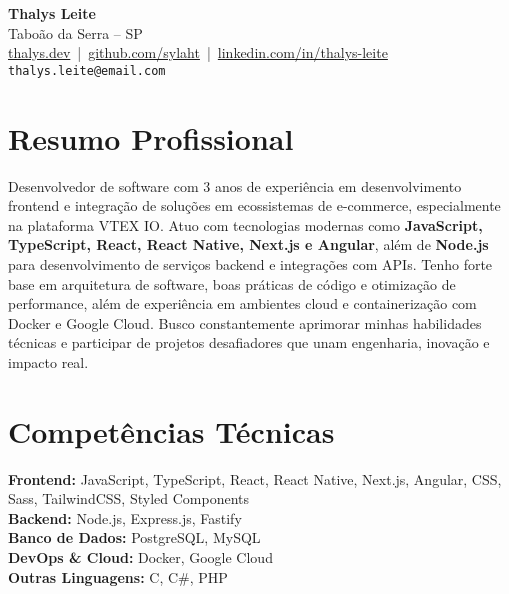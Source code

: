 \documentclass[a4paper,10pt]{article}
\begin{document}
\begin{center}
    {\LARGE \textbf{Thalys Leite}}\\[4pt]
    Taboão da Serra – SP \\[2pt]
    \href{https://thalys.dev}{thalys.dev} \,|\, 
    \href{https://github.com/sylaht}{github.com/sylaht} \,|\, 
    \href{https://www.linkedin.com/in/thalys-leite-94a80a234/}{linkedin.com/in/thalys-leite}\\[6pt]
    \texttt{thalys.leite@email.com} %
\end{center}

\vspace{0.4cm}

\section*{Resumo Profissional}
Desenvolvedor de software com 3 anos de experiência em desenvolvimento frontend e integração de soluções em ecossistemas de e-commerce, especialmente na plataforma VTEX IO. 
Atuo com tecnologias modernas como \textbf{JavaScript, TypeScript, React, React Native, Next.js e Angular}, além de \textbf{Node.js} para desenvolvimento de serviços backend e integrações com APIs. 
Tenho forte base em arquitetura de software, boas práticas de código e otimização de performance, além de experiência em ambientes cloud e containerização com Docker e Google Cloud. 
Busco constantemente aprimorar minhas habilidades técnicas e participar de projetos desafiadores que unam engenharia, inovação e impacto real.

\section*{Competências Técnicas}

\textbf{Frontend:} JavaScript, TypeScript, React, React Native, Next.js, Angular, CSS, Sass, TailwindCSS, Styled Components\\
\textbf{Backend:} Node.js, Express.js, Fastify\\
\textbf{Banco de Dados:} PostgreSQL, MySQL\\
\textbf{DevOps \& Cloud:} Docker, Google Cloud\\
\textbf{Outras Linguagens:} C, C\#, PHP
\end{document}
